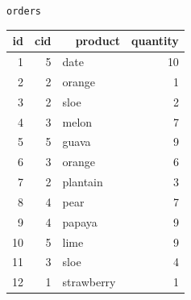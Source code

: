 \documentclass[
    aspectratio=169,
]{beamer}
\begin{document}
\begin{frame}[fragile]
\begin{minipage}[c]{0.45\textwidth}
        \vspace{0.5cm}
        
        \normalsize \texttt{orders}
        \vspace{0.1cm}
        
        \tiny
        \begin{tabular}{ |r|r|l|r| }
        \hline
            id & cid & ~~product & quantity \\
        \hline
            1 & 5 & date & 10 \\
            2 & 2 & orange & 1 \\
            3 & 2 & sloe & 2 \\
            4 & 3 & melon & 7 \\
            5 & 5 & guava & 9 \\
            6 & 3 & orange & 6 \\
            7 & 2 & plantain & 3 \\
            8 & 4 & pear & 7 \\
            9 & 4 & papaya & 9 \\
            10 & 5 & lime & 9 \\
            11 & 3 & sloe & 4 \\
            12 & 1 & strawberry & 1 \\
        \hline
        \end{tabular}
    \end{minipage}
\end{frame}
\end{document}
